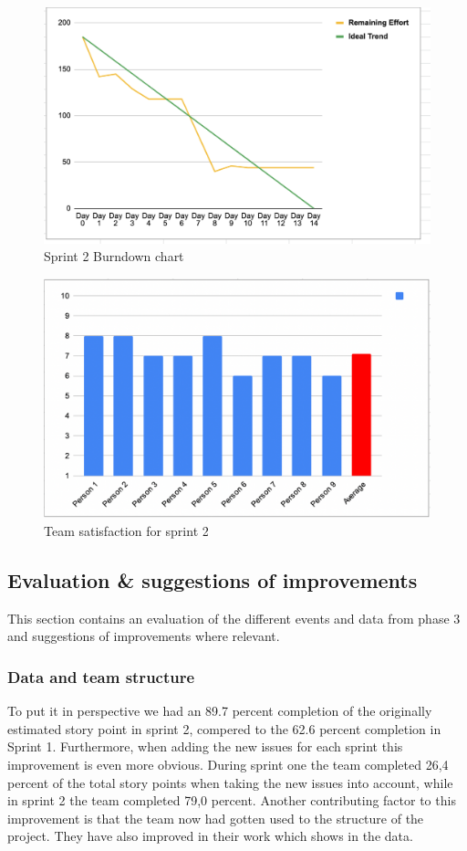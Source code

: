 \documentclass{article}
\begin{document}
\begin{figure}[h!]
    \centering
    \includegraphics[scale=0.6]{pfrFigures/Sprint2.png}
    \caption{Sprint 2 Burndown chart}
    \label{fig:Burndown2}
\end{figure}

\begin{figure}[h!]
    \centering
    \includegraphics[scale=0.6]{pfrFigures/TeamSatisfaction2.png}
    \caption{Team satisfaction for sprint 2}
    \label{fig:Satisfaction2}
\end{figure}

\subsection{Evaluation \& suggestions of improvements} 
This section contains an evaluation of the different events and data from phase 3 and suggestions of improvements where relevant.  

\subsubsection{Data and team structure}
To put it in perspective we had an 89.7 percent completion of the originally estimated story point in sprint 2, compered to the 62.6 percent completion in Sprint 1. Furthermore, when adding the new issues for each sprint this improvement is even more obvious. During sprint one the team completed 26,4 percent of the total story points when taking the new issues into account, while in sprint 2 the team completed 79,0 percent. Another contributing factor to this improvement is that the team now had gotten used to the structure of the project. They have also improved in their work which shows in the data. 
\end{document}
